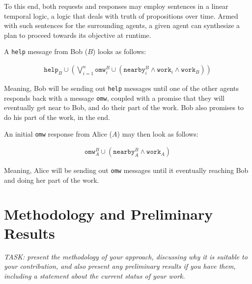 \documentclass[conference]{IEEEtran}
\begin{document}
To this end, both requests and responses may employ sentences in a
linear temporal logic, a logic that deals with truth of propositions
over time\cite{1977-LTL}. Armed with such sentences for the
surrounding agents, a given agent can synthesize a plan to proceed
towards its objective at runtime\cite{2022-Live-Synthesis}.

A \texttt{help} message from Bob ($B$) looks as follows:

\begin{align}
\mathtt{help}_B \cup %
  \left( \bigvee_{i=1}^n %
    \mathtt{omw}_i^B \cup %
    \left(\mathtt{nearby}_i^B \wedge \mathtt{work}_i \wedge \mathtt{work}_B \right) %
  \right) %
\end{align}

Meaning, Bob will be sending out \texttt{help} messages until one of
the other agents responds back with a message \texttt{omw}, coupled
with a promise that they will eventually get near to Bob, and do their
part of the work. Bob also promises to do his part of the work, in the
end.

An initial \texttt{omw} response from Alice ($A$) may then look as
follows:

\begin{align}
\mathtt{omw}^B_A \cup %
  \left( \mathtt{nearby}_A^B \wedge \mathtt{work}_A \right)%
\end{align}

Meaning, Alice will be sending out \texttt{omw} messages until it
eventually reaching Bob and doing her part of the work.



\section{Methodology and Preliminary Results}

\emph{TASK: present the methodology of your approach, discussing why
it is suitable to your contribution, and also present any preliminary
results if you have them, including a statement about the current
status of your work.}
\end{document}
